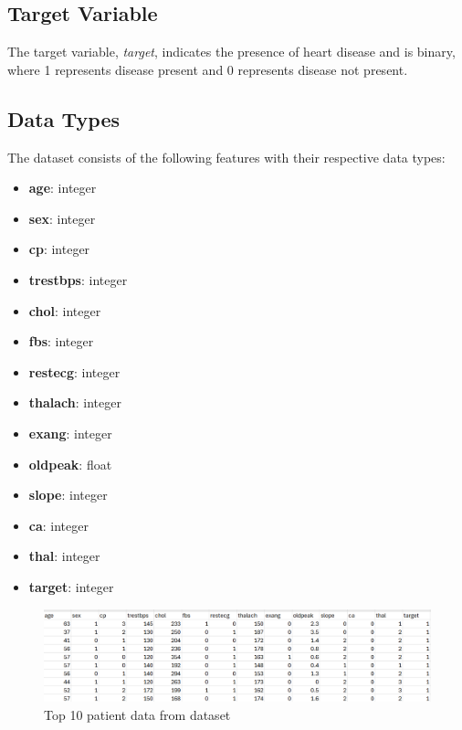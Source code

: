 \subsection{Target Variable}
The target variable, \textit{target}, indicates the presence of heart disease and is binary, where 1 represents disease present and 0 represents disease not present.

\subsection{Data Types}
The dataset consists of the following features with their respective data types:
\begin{itemize}
    \item \textbf{age}: integer
    \item \textbf{sex}: integer
    \item \textbf{cp}: integer
    \item \textbf{trestbps}: integer
    \item \textbf{chol}: integer
    \item \textbf{fbs}: integer
    \item \textbf{restecg}: integer
    \item \textbf{thalach}: integer
    \item \textbf{exang}: integer
    \item \textbf{oldpeak}: float
    \item \textbf{slope}: integer
    \item \textbf{ca}: integer
    \item \textbf{thal}: integer
    \item \textbf{target}: integer
\end{itemize}




\begin{figure}
    \centering
    \includegraphics[width=1.0\textwidth]{figures/Datasettop10patients.png}
    \caption{Top 10 patient data from dataset}
    \label{fig:example}
\end{figure}
